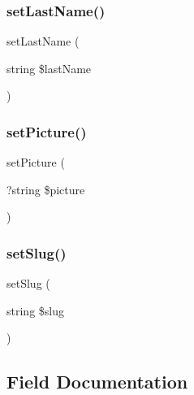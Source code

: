 \mbox{\label{class_app_1_1_entity_1_1_user_a69a8e387abf5660e10ce12c2b85539ea}} 
\subsubsection{\texorpdfstring{setLastName()}{setLastName()}}
{\footnotesize\ttfamily set\+Last\+Name (\begin{DoxyParamCaption}\item[{string}]{\$last\+Name }\end{DoxyParamCaption})}

\mbox{\label{class_app_1_1_entity_1_1_user_a67f2c70c37897c81e3e7a5905878e9c6}} 
\subsubsection{\texorpdfstring{setPicture()}{setPicture()}}
{\footnotesize\ttfamily set\+Picture (\begin{DoxyParamCaption}\item[{?string}]{\$picture }\end{DoxyParamCaption})}

\mbox{\label{class_app_1_1_entity_1_1_user_a80553db2cd69e4c5c48c124c95385012}} 
\subsubsection{\texorpdfstring{setSlug()}{setSlug()}}
{\footnotesize\ttfamily set\+Slug (\begin{DoxyParamCaption}\item[{string}]{\$slug }\end{DoxyParamCaption})}



\subsection{Field Documentation}
\mbox{\label{class_app_1_1_entity_1_1_user_a3feb982090765e64bee6301431331696}} 
